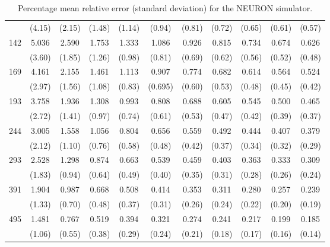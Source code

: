 \begin{table}[!h]
\begin{tabular}{r|cccccccccc}
     & (4.15) & (2.15) & (1.48) & (1.14) & (0.94) & (0.81) & (0.72) & (0.65) & (0.61) & (0.57)\\[2pt]
 142 & 5.036 & 2.590 & 1.753 & 1.333 & 1.086 & 0.926 & 0.815 & 0.734 & 0.674 & 0.626\\[-2pt]
     & (3.60) & (1.85) & (1.26) & (0.98) & (0.81) & (0.69) & (0.62) & (0.56) & (0.52) & (0.48)\\[2pt]
 169 & 4.161 & 2.155 & 1.461 & 1.113 & 0.907 & 0.774 & 0.682 & 0.614 & 0.564 & 0.524\\[-2pt]
     & (2.97) & (1.56) & (1.08) & (0.83) & (0.695) & (0.60) & (0.53) & (0.48) & (0.45) & (0.42)\\[2pt]
 193 & 3.758 & 1.936 & 1.308 & 0.993 & 0.808 & 0.688 & 0.605 & 0.545 & 0.500 & 0.465\\[-2pt]
     & (2.72) & (1.41) & (0.97) & (0.74) & (0.61) & (0.53) & (0.47) & (0.42) & (0.39) & (0.37)\\[2pt]
 244 & 3.005 & 1.558 & 1.056 & 0.804 & 0.656 & 0.559 & 0.492 & 0.444 & 0.407 & 0.379\\[-2pt]
     & (2.12) & (1.10) & (0.76) & (0.58) & (0.48) & (0.42) & (0.37) & (0.34) & (0.32) & (0.29)\\[2pt]
 293 & 2.528 & 1.298 & 0.874 & 0.663 & 0.539 & 0.459 & 0.403 & 0.363 & 0.333 & 0.309\\[-2pt]
     & (1.83) & (0.94) & (0.64) & (0.49) & (0.40) & (0.35) & (0.31) & (0.28) & (0.26) & (0.24)\\[2pt]
 391 & 1.904 & 0.987 & 0.668 & 0.508 & 0.414 & 0.353 & 0.311 & 0.280 & 0.257 & 0.239\\[-2pt]
     & (1.33) & (0.70) & (0.48) & (0.37) & (0.31) & (0.26) & (0.24) & (0.22) & (0.20) & (0.19)\\[2pt]
 495 & 1.481 & 0.767 & 0.519 & 0.394 & 0.321 & 0.274 & 0.241 & 0.217 & 0.199 & 0.185\\[-2pt]
     & (1.06) & (0.55) & (0.38) & (0.29) & (0.24) & (0.21) & (0.18) & (0.17) & (0.16) & (0.14)\\[2pt]
\hline
\end{tabular}
\parbox{6in}{\caption{\label{nr} Percentage mean relative error (standard
deviation) for the NEURON simulator.}}
\end{table}


